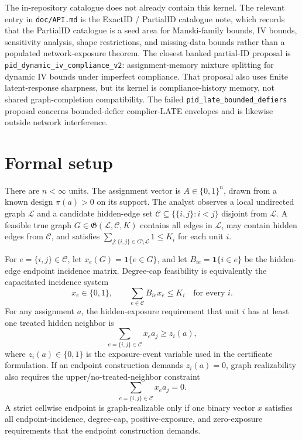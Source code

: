 \documentclass[11pt]{article}
\newcommand{\one}{\mathbf{1}}
\theoremstyle{definition}
\theoremstyle{plain}
\theoremstyle{remark}
\begin{document}
The in-repository catalogue does not already contain this kernel.  The relevant entry in \texttt{doc/API.md} is the ExactID / PartialID catalogue note, which records that the PartialID catalogue is a seed area for Manski-family bounds, IV bounds, sensitivity analysis, shape restrictions, and missing-data bounds rather than a populated network-exposure theorem.  The closest banked partial-ID proposal is \texttt{pid\_dynamic\_iv\_compliance\_v2}: assignment-memory mixture splitting for dynamic IV bounds under imperfect compliance.  That proposal also uses finite latent-response sharpness, but its kernel is compliance-history memory, not shared graph-completion compatibility.  The failed \texttt{pid\_late\_bounded\_defiers} proposal concerns bounded-defier complier-LATE envelopes and is likewise outside network interference.

\section{Formal setup}
There are \(n<\infty\) units.  The assignment vector is \(A\in\{0,1\}^n\), drawn from a known design \(\pi(a)>0\) on its support.  The analyst observes a local undirected graph \(\mathcal L\) and a candidate hidden-edge set \(\mathcal C\subseteq\{\{i,j\}:i<j\}\) disjoint from \(\mathcal L\).  A feasible true graph \(G\in\mathfrak G(\mathcal L,\mathcal C,K)\) contains all edges in \(\mathcal L\), may contain hidden edges from \(\mathcal C\), and satisfies \(\sum_{j:\{i,j\}\in G\setminus\mathcal L}1\le K_i\) for each unit \(i\).

For \(e=\{i,j\}\in\mathcal C\), let \(x_e(G)=\one\{e\in G\}\), and let \(B_{ie}=\one\{i\in e\}\) be the hidden-edge endpoint incidence matrix.  Degree-cap feasibility is equivalently the capacitated incidence system
\[
x_e\in\{0,1\},\qquad \sum_{e\in\mathcal C} B_{ie}x_e\le K_i\quad\text{for every }i.
\]
For any assignment \(a\), the hidden-exposure requirement that unit \(i\) has at least one treated hidden neighbor is
\[
\sum_{e=\{i,j\}\in\mathcal C} x_e a_j \ge z_i(a),
\]
where \(z_i(a)\in\{0,1\}\) is the exposure-event variable used in the certificate formulation.  If an endpoint construction demands \(z_i(a)=0\), graph realizability also requires the upper/no-treated-neighbor constraint
\[
\sum_{e=\{i,j\}\in\mathcal C} x_e a_j =0 .
\]
A strict cellwise endpoint is graph-realizable only if one binary vector \(x\) satisfies all endpoint-incidence, degree-cap, positive-exposure, and zero-exposure requirements that the endpoint construction demands.
\end{document}
